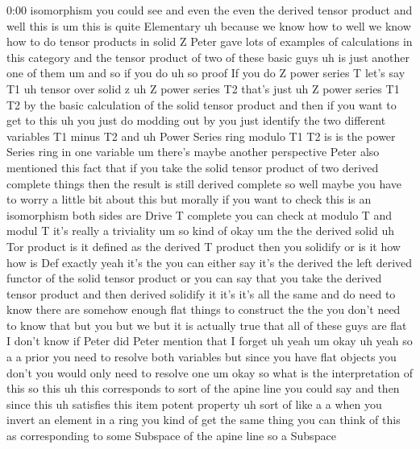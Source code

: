 \begin{unfinished}{0:00}
isomorphism  you  could  see  and  even  the
even  the  derived  tensor
product  and
well  this  is
um  this  is  quite  Elementary  uh  because
we  know  how  to  well  we  know  how  to  do
tensor  products  in  solid  Z  Peter  gave
lots  of  examples  of  calculations  in  this
category  and  the  tensor  product  of  two
of  these  basic  guys  uh  is  just  another
one  of  them  um  and  so  if  you  do  uh  so
proof  If  you  do  Z  power  series  T  let's
say  T1  uh  tensor  over  solid  z  uh  Z  power
series
T2  that's  just  uh  Z  power  series  T1
T2  by  the  basic  calculation  of  the  solid
tensor  product  and  then  if  you  want  to
get  to  this  uh  you  just  do  modding  out
by  you  just  identify  the  two  different
variables  T1  minus  T2  and  uh  Power
Series  ring  modulo  T1  T2  is  is  the  power
Series  ring  in  one
variable  um  there's  maybe  another
perspective  Peter  also  mentioned  this
fact  that  if  you  take  the  solid  tensor
product  of  two  derived  complete  things
then  the  result  is  still  derived
complete  so  well  maybe  you  have  to  worry
a  little  bit  about  this  but  morally  if
you  want  to  check  this  is  an
isomorphism  both  sides  are  Drive  T
complete  you  can  check  at  modulo  T  and
modul  T  it's  really  a  triviality  um  so
kind
of  okay  um  the  the  derived
solid  uh  Tor  product  is  it  defined  as
the  derived  T  product  then  you  solidify
or  is  it  how  how  is  Def  exactly  yeah
it's  the  you  can  either  say  it's  the
derived  the  left  derived  functor  of  the
solid  tensor  product  or  you  can  say  that
you  take  the  derived  tensor  product  and
then  derived  solidify  it  it's  it's  all
the
same  and  do  need  to  know  there  are
somehow  enough  flat  things  to  construct
the  the  you  don't  need  to  know  that  but
you  but  we  but  it  is  actually  true  that
all  of  these  guys  are  flat  I  don't  know
if  Peter  did  Peter  mention  that  I  forget
uh  yeah
um
okay  uh  yeah  so  a  a  prior  you  need  to
resolve  both  variables  but  since  you
have  flat  objects  you  don't  you  would
only  need  to  resolve  one  um  okay  so  what
is  the  interpretation  of  this  so  this  uh
this  corresponds  to  sort  of  the  apine
line  you  could  say  and  then  since  this
uh  satisfies  this  item  potent  property
uh  sort  of  like  a  a  when  you  invert  an
element  in  a  ring  you  kind  of  get  the
same  thing  you  can  think  of  this  as
corresponding  to  some
Subspace  of  the  apine  line  so  a  Subspace

\end{unfinished}
